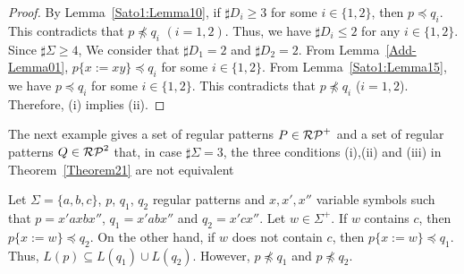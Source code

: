 \begin{proof}
    By Lemma~\ref{Sato1:Lemma10}, %
    if $\sharp D_{i} \geq 3$ for some $i \in \{1,2\}$,
    then $p \preceq q_{i}$.
    This contradicts that $p \not\preceq q_{i}$ $(i=1,2)$.
    Thus, we have $\sharp D_{i} \leq 2$ for any $i \in \{1,2\}$.
    Since $\sharp \Sigma \geq 4$,
    We consider that $\sharp D_{1}=2$ and $\sharp D_{2} = 2$.
    From Lemma~\ref{Add-Lemma01}, %
    $p\{x:=xy\} \preceq q_{i}$ for some $i \in \{1,2\}$.
    From Lemma~\ref{Sato1:Lemma15}, %
    we have $p \preceq q_{i}$ for some $i \in \{1,2\}$.
    This contradicts that $p \not\preceq q_{i}$ ($i=1,2$).
    Therefore, (i) implies (ii).
\end{proof}

The next example gives a set of regular patterns $P \in \mathcal{RP}^{+}$ and a set of regular patterns $Q \in \mathcal{RP}^{2}$ that, 
in case $\sharp\Sigma = 3$, 
the three conditions (i),(ii) and (iii) in Theorem~\ref{Theorem21} are not equivalent


\begin{ex}%
    Let $\Sigma = \{a,b,c\}$, $p$, $q_{1}$, $q_{2}$ regular patterns and
    $x,x',x''$ variable symbols such that
    $p = x'axbx''$, $q_{1} = x'abx''$ and $q_{2} = x'cx''$.
    Let $w \in \Sigma^{+}$.
    If $w$ contains $c$, then $p \{x:=w\} \preceq q_{2}$.
    On the other hand, if $w$ does not contain $c$,
    then $p\{x:=w\} \preceq q_{1}$.
    Thus, $L(p) \subseteq L(q_{1}) \cup L(q_{2})$.
    However, $p \not\preceq q_{1}$ and $p \not\preceq q_{2}$.
\end{ex}

